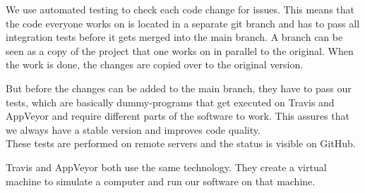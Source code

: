 We use automated testing to check each code change for issues. This means that the code everyone works on is located in a separate git branch \cite{gitbranch} and has to pass all integration tests before it gets merged into the main branch. A branch can be seen as a copy of the project that one works on in parallel to the original. When the work is done, the changes are copied over to the original version.

But before the changes can be added to the main branch, they have to pass our tests, which are basically dummy-programs that get executed on Travis and AppVeyor and require different parts of the software to work. This assures that we always have a stable version and improves code quality. \\
These tests are performed on remote servers and the status is visible on GitHub. \cite{githubci}

Travis and AppVeyor both use the same technology. They create a virtual machine to simulate a computer and run our software on that machine.

